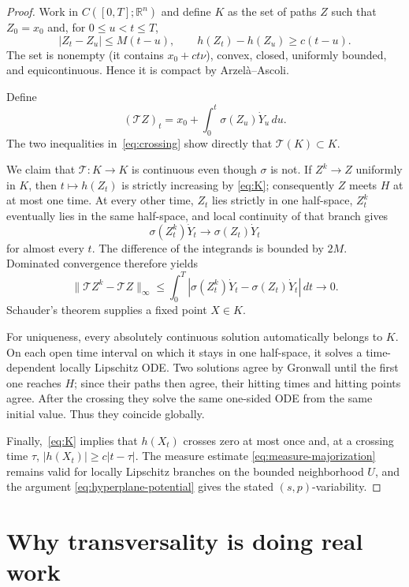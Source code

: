 \documentclass[11pt]{article}
\newcommand{\R}{\mathbb{R}}
\newcommand{\Tmap}{\mathcal{T}}
\begin{document}
\begin{proof}
Work in $C([0,T];\R^n)$ and define $K$ as the set of paths $Z$ such that
$Z_0=x_0$ and, for $0\leq u<t\leq T$,
\begin{equation}\label{eq:K}
 |Z_t-Z_u|\leq M(t-u),
 \qquad h(Z_t)-h(Z_u)\geq c(t-u).
\end{equation}
The set is nonempty (it contains $x_0+ct\nu$), convex, closed, uniformly
bounded, and equicontinuous.  Hence it is compact by Arzel\`a--Ascoli.

Define
\[
 (\Tmap Z)_t=x_0+\int_0^t\sigma(Z_u)\dot Y_u\,du.
\]
The two inequalities in~\eqref{eq:crossing} show directly that
$\Tmap(K)\subset K$.

We claim that $\Tmap:K\to K$ is continuous even though $\sigma$ is not.  If
$Z^k\to Z$ uniformly in $K$, then $t\mapsto h(Z_t)$ is strictly increasing by
\eqref{eq:K}; consequently $Z$ meets $H$ at at most one time.  At every other
time, $Z_t$ lies strictly in one half-space, $Z^k_t$ eventually lies in the
same half-space, and local continuity of that branch gives
\[
 \sigma(Z^k_t)\dot Y_t\longrightarrow\sigma(Z_t)\dot Y_t
\]
for almost every $t$.  The difference of the integrands is bounded by $2M$.
Dominated
convergence therefore yields
\[
 \|\Tmap Z^k-\Tmap Z\|_\infty
 \leq\int_0^T
 |\sigma(Z^k_t)\dot Y_t-\sigma(Z_t)\dot Y_t|\,dt\longrightarrow0.
\]
Schauder's theorem supplies a fixed point $X\in K$.

For uniqueness, every absolutely continuous solution automatically belongs to
$K$.  On each open time interval on which it stays in one half-space, it solves
a time-dependent locally Lipschitz ODE.  Two solutions agree by Gronwall until
the first one reaches $H$; since their paths then agree, their hitting times
and hitting points agree.  After the crossing they solve the same one-sided
ODE from the same initial value.  Thus they coincide globally.

Finally,~\eqref{eq:K} implies that $h(X_t)$ crosses zero at most once and, at a
crossing time $\tau$, $|h(X_t)|\geq c|t-\tau|$.  The measure estimate
\eqref{eq:measure-majorization} remains valid for locally Lipschitz branches on
the bounded neighborhood $U$, and the argument
\eqref{eq:hyperplane-potential} gives the stated $(s,p)$-variability.
\end{proof}

\section{Why transversality is doing real work}
\end{document}
